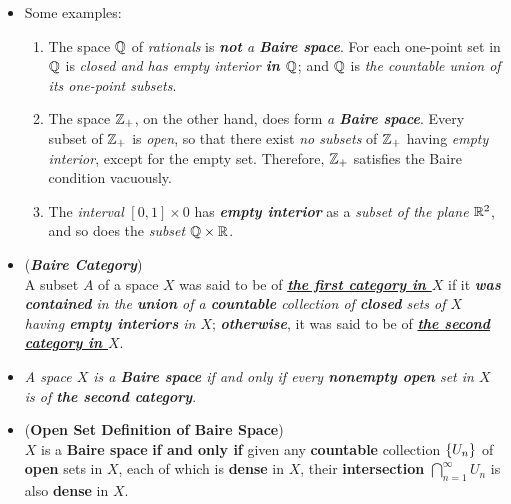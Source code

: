 \documentclass[11pt]{article}
\begin{document}
\begin{itemize}
\item \begin{example} 
Some  examples:
\begin{enumerate}
\item The space ${\mathbb Q}$ of \emph{rationals} is \emph{\textbf{not} a \textbf{Baire space}}. For each one-point set in ${\mathbb Q}$ is \emph{closed and has empty interior \textbf{in ${\mathbb Q}$}}; and ${\mathbb Q}$ is \emph{the countable union of its one-point subsets}.
\item The space ${\mathbb Z}_{+}$, on the other hand, does form \emph{a \textbf{Baire space}}. Every subset of ${\mathbb Z}_{+}$ is \emph{open}, so that there exist \emph{no subsets} of ${\mathbb Z}_{+}$ having \emph{empty interior}, except for the empty set. Therefore, ${\mathbb Z}_{+}$ satisfies the Baire condition vacuously.
\item The \emph{interval} $[0, 1] \times 0$ has \emph{\textbf{empty interior}} as a \emph{subset of the plane} ${\mathbb R}^2$, and so does the \emph{subset} ${\mathbb Q} \times {\mathbb R}$.
\end{enumerate}
\end{example}

\item \begin{definition}  (\emph{\textbf{Baire Category}})\\
A subset $A$ of a space $X$ was said to be of \underline{\emph{\textbf{the first category in $X$}}} if it \emph{\textbf{was contained} in the \textbf{union} of a \textbf{countable} collection of \textbf{closed} sets of $X$ having \textbf{empty interiors} in $X$}; \emph{\textbf{otherwise}}, it was said to be of \underline{\emph{\textbf{the second category in $X$}}}. 
\end{definition}

\item \begin{remark}
\emph{A space $X$ is a \textbf{Baire space} if and only if every \textbf{nonempty open} set in $X$ is of \textbf{the second category}}.
\end{remark}

\item \begin{lemma}(\textbf{Open Set Definition of Baire Space}) \citep{munkres2000topology} \\
$X$ is a \textbf{Baire space} \textbf{if and only if} given any \textbf{countable} collection $\left\{U_n\right\}$ of \textbf{open} sets in $X$, each of which is \textbf{dense} in $X$, their \textbf{intersection} $\bigcap_{n=1}^{\infty}U_n$ is also \textbf{dense} in $X$.
\end{lemma}


\end{itemize}
\end{document}

